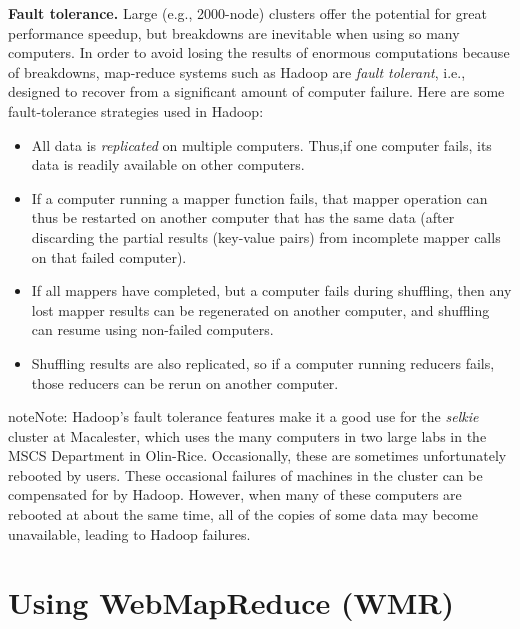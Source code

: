\documentclass[letterpaper,10pt,openany,oneside]{sphinxmanual}
\begin{document}
\textbf{Fault tolerance.} Large (e.g., 2000-node) clusters offer the
potential for great performance speedup, but breakdowns are
inevitable when using so many computers. In order to avoid losing
the results of enormous computations because of breakdowns,
map-reduce systems such as Hadoop are \emph{fault tolerant}, i.e.,
designed to recover from a significant amount of computer failure.
Here are some fault-tolerance strategies used in Hadoop:
\begin{itemize}
\item {} 
All data is \emph{replicated} on multiple computers. Thus,if one
computer fails, its data is readily available on other computers.

\item {} 
If a computer running a mapper function fails, that mapper
operation can thus be restarted on another computer that has the
same data (after discarding the partial results (key-value pairs)
from incomplete mapper calls on that failed computer).

\item {} 
If all mappers have completed, but a computer fails during
shuffling, then any lost mapper results can be regenerated on
another computer, and shuffling can resume using non-failed
computers.

\item {} 
Shuffling results are also replicated, so if a computer running
reducers fails, those reducers can be rerun on another computer.

\end{itemize}

\begin{notice}{note}{Note:}
Hadoop's fault tolerance features make it a good use for
the \emph{selkie} cluster at Macalester, which uses the many computers
in two large labs in the MSCS Department in Olin-Rice.
Occasionally, these are sometimes unfortunately rebooted by users.
These occasional failures of machines in the cluster can be
compensated for by Hadoop. However, when many of these computers
are rebooted at about the same time, all of the copies of some data
may become unavailable, leading to Hadoop failures.
\end{notice}


\chapter{Using WebMapReduce (WMR)}
\label{wmr_basic/wmr_multi_language:using-webmapreduce-wmr}\label{wmr_basic/wmr_multi_language::doc}
\end{document}
